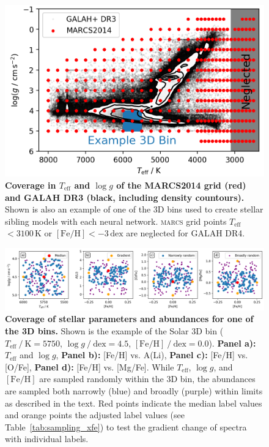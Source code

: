 \documentclass[
  journal=pasa,
  manuscript=research-paper, %
  year=2024,
  volume=37
]{cup-journal}
\newcommand{\Teff}{$T_\mathrm{eff}$\xspace}
\newcommand{\logg}{$\log g$\xspace}
\newcommand{\feh}{$\mathrm{[Fe/H]}$\xspace}
\newcommand{\marcs}{\textsc{marcs}\xspace}
\newcommand{\dex}{\,\mathrm{dex}}	%
\newcommand{\K}{\,\mathrm{K}}	%
\begin{document}
\begin{figure}[ht]
 \centering
 \includegraphics[width=\textwidth]{figures/teff_logg_grid_coverage.png}
 \caption{\textbf{Coverage in \Teff and \logg of the MARCS2014 grid (red) and GALAH DR3 (black, including density countours).} Shown is also an example of one of the 3D bins used to create stellar sibling models with each neural network. \marcs grid points \Teff$ < 3100\K$ or \feh$<-3\dex$ are neglected for GALAH DR4.}
 \label{fig:teff_logg_grid_coverage}
\end{figure}

\begin{figure}[ht]
 \centering
 \includegraphics[width=\textwidth]{figures/example_3d_bin_sample.png}
 \caption{\textbf{Coverage of stellar parameters and abundances for one of the 3D bins.} Shown is the example of the Solar 3D bin ($T_\mathrm{eff}~/~\mathrm{K} = 5750$, $\log g~/~\mathrm{dex} = 4.5$, $\mathrm{[Fe/H]}~/~\mathrm{dex} = 0.0$). \textbf{Panel a):} \Teff and \logg, \textbf{Panel b):} [Fe/H] vs. A(Li), \textbf{Panel c):} [Fe/H] vs. [O/Fe], \textbf{Panel d):} [Fe/H] vs. [Mg/Fe]. While \Teff, \logg, and \feh are sampled randomly within the 3D bin, the abundances are sampled both narrowly (blue) and broadly (purple) within limits as described in the text. Red points indicate the median label values and orange points the adjusted label values (see Table~\ref{tab:sampling_xfe}) to test the gradient change of spectra with individual labels.}
 \label{fig:example_3d_bin_sample}
\end{figure}
\end{document}
